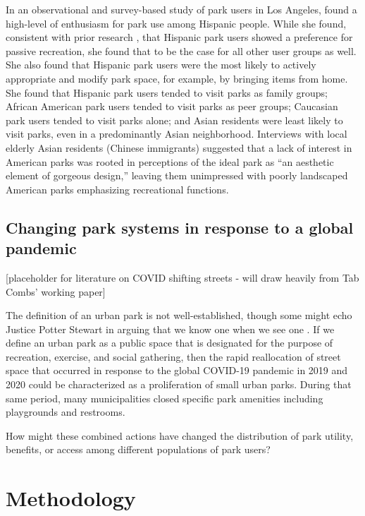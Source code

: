 \documentclass[]{elsarticle} %
\begin{document}
In an observational and survey-based study of park users in Los Angeles,
\citet{loukaitou1995urban} found a high-level of enthusiasm for park use among Hispanic
people. While she found, consistent with prior research \citep{baas1993influence, hutchison1987ethnicity, irwin1990mexican}, that Hispanic park users showed a
preference for passive recreation, she found that to be the case for all other
user groups as well. She also found that Hispanic park users were the most
likely to actively appropriate and modify park space, for example, by bringing
items from home. She found that Hispanic park users tended to visit parks as
family groups; African American park users tended to visit parks as peer groups;
Caucasian park users tended to visit parks alone; and Asian residents were least
likely to visit parks, even in a predominantly Asian neighborhood. Interviews
with local elderly Asian residents (Chinese immigrants) suggested that a lack of
interest in American parks was rooted in perceptions of the ideal park as ``an
aesthetic element of gorgeous design,'' leaving them unimpressed with poorly
landscaped American parks emphasizing recreational functions.

\hypertarget{changing-park-systems-in-response-to-a-global-pandemic}{%
\subsection{Changing park systems in response to a global pandemic}\label{changing-park-systems-in-response-to-a-global-pandemic}}

{[}placeholder for literature on COVID shifting streets - will draw heavily from
Tab Combs' working paper{]}

The definition of an urban park is not well-established, though some might echo
Justice Potter Stewart in arguing that we know one when we see one
\citep{1964jacobellis}. If we define an urban park as a public space that is
designated for the purpose of recreation, exercise, and social gathering, then
the rapid reallocation of street space that occurred in response to the global
COVID-19 pandemic in 2019 and 2020 could be characterized as a proliferation of
small urban parks. During that same period, many municipalities closed specific
park amenities including playgrounds and restrooms.

How might these combined actions have changed the distribution of park utility,
benefits, or access among different populations of park users?

\hypertarget{methodology}{%
\section{Methodology}\label{methodology}}
\end{document}
